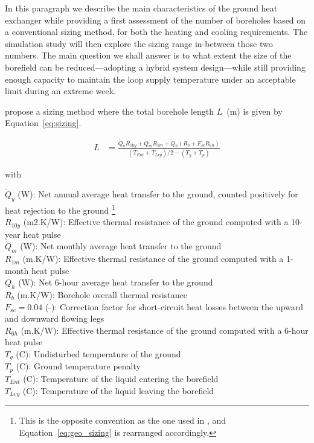 In this paragraph we describe the main characteristics of the ground heat exchanger while providing a first assessment of the number of boreholes based on a conventional sizing method, for both the heating and cooling requirements.
The simulation study will then explore the sizing range in-between those two numbers.
The main question we shall answer is to what extent the size of the borefield can be reduced---adopting a hybrid system design---while still providing enough capacity to maintain the loop supply temperature under an acceptable limit during an extreme week.

\cite{Kavanaugh2014} propose a sizing method where the total borehole length $L$~(m) is given by Equation~\ref{eq:sizing}.

\begin{align}
    \label{eq:geo_sizing}
    L &= \frac{\dot{Q}_a R_{10y} + \dot{Q}_m R_{1m} + \dot{Q}_h \left( R_b + F_{sc} R_{6h} \right)}{\left( T_{Ent} + T_{Lvg} \right) / 2 - \left( T_g + T_p \right)}
\end{align}

with

\begin{avec}
    $\dot{Q}_y$ (W): Net annual average heat transfer to the ground, counted positively for heat rejection to the ground%
    \footnote{This is the opposite convention as the one used in \cite{Kavanaugh2014}, and Equation~\ref{eq:geo_sizing} is rearranged accordingly.}\\
    $R_{10y}$ (m2.K/W): Effective thermal resistance of the ground computed with a 10-year heat pulse \\
    $\dot{Q}_m$ (W): Net monthly average heat transfer to the ground\\
    $R_{1m}$ (m.K/W): Effective thermal resistance of the ground computed with a 1-month heat pulse \\
    $\dot{Q}_h$ (W): Net 6-hour average heat transfer to the ground\\
    $R_b$ (m.K/W): Borehole overall thermal resistance \\
    $F_{sc} = 0.04$ (-): Correction factor for short-circuit heat losses between the upward and downward flowing legs\\
    $R_{6h}$ (m.K/W): Effective thermal resistance of the ground computed with a 6-hour heat pulse \\
    $T_g$ (C): Undisturbed temperature of the ground \\
    $T_p$ (C): Ground temperature penalty \\
    $T_{Ent}$ (C): Temperature of the liquid entering the borefield \\
    $T_{Lvg}$ (C): Temperature of the liquid leaving the borefield \\
\end{avec}

